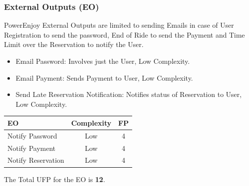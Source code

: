 \documentclass[a4paper]{article}
\begin{document}
\subsubsection{External Outputs (EO)}
PowerEnjoy External Outputs are limited to sending Emails in case of User Registration to send the password, End of Ride to send the Payment and Time Limit over the Reservation to notify the User.
\begin{itemize}
\item Email Password: Involves just the User, Low Complexity.
\item Email Payment: Sends Payment to User, Low Complexity.
\item Send Late Reservation Notification: Notifies status of Reservation to User, Low Complexity.
\end{itemize}
\begin{center}
\begin{tabular}{ | l | c | c | }
\hline
	\textbf{EO} & \textbf{Complexity} & \textbf{FP} \\ \hline\hline
	Notify Password & Low & 4 \\ \hline
	Notify Payment & Low & 4  \\ \hline
	Notify Reservation & Low & 4  \\ \hline
\end{tabular}
\end{center}
The Total UFP for the EO is \textbf{12}.
\end{document}
